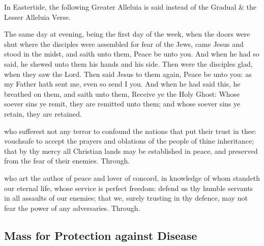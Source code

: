 
\begin{rubric}
    In Eastertide, the following Greater Alleluia is said instead of the Gradual \& the Lesser Alleluia Verse.
\end{rubric}


 The same day at evening, being the first day of the week, when the doors were shut where the disciples were assembled for fear of the Jews, came Jesus and stood in the midst, and saith unto them, Peace be unto you. And when he had so said, he shewed unto them his hands and his side. Then were the disciples glad, when they saw the Lord. Then said Jesus to them again, Peace be unto you: as my Father hath sent me, even so send I you. And when he had said this, he breathed on them, and saith unto them, Receive ye the Holy Ghost: Whose soever sins ye remit, they are remitted unto them; and whose soever sins ye retain, they are retained.


\secret
{} who sufferest not any terror to confound the nations that put their trust in thee: vouchsafe to accept the prayers and oblations of the people of thine inheritance; that by thy mercy all Christian lands may be established in peace, and preserved from the fear of their enemies. Through.


\postcommunion
{} who art the author of peace and lover of concord, in knowledge of whom standeth our eternal life, whose service is perfect freedom: defend us thy humble servants in all assaults of our enemies; that we, surely trusting in thy defence, may not fear the power of any adversaries. Through.


\subsection{Mass for Protection against Disease}

